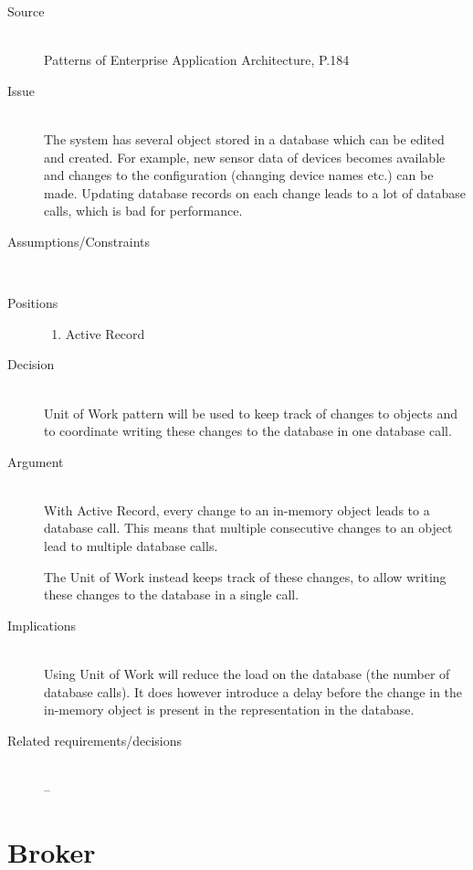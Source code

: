 \begin{description}
\item [Source]~\\
Patterns of Enterprise Application Architecture, P.184 \cite{Fowler:2002:PEA:579257}

\item [Issue]~\\
The system has several object stored in a database which can be edited and created. For example, new sensor data of devices becomes available and changes to the configuration (changing device names etc.) can be made. Updating database records on each change leads to a lot of database calls, which is bad for performance.

\item [Assumptions/Constraints]~\\

\item [Positions]
\begin{enumerate}
\item Active Record
\end{enumerate}

\item [Decision] ~\\
Unit of Work pattern will be used to keep track of changes to objects and to coordinate writing these changes to the database in one database call.

\item [Argument]~\\
With Active Record, every change to an in-memory object leads to a database call. This means that multiple consecutive changes to an object lead to multiple database calls. 

The Unit of Work instead keeps track of these changes, to allow writing these changes to the database in a single call.

\item [Implications]~\\
Using Unit of Work will reduce the load on the database (the number of database calls). It does however introduce a delay before the change in the in-memory object is present in the representation in the database.

\item [Related requirements/decisions]~\\
--

\end{description}

\section{Broker}

